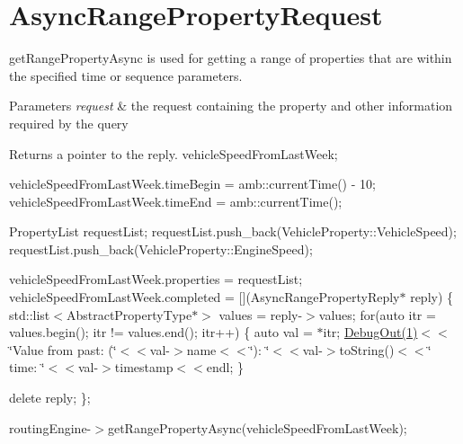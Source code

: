 \hypertarget{AsyncRangePropertyRequest-example}{\section{Async\+Range\+Property\+Request}
}
get\+Range\+Property\+Async is used for getting a range of properties that are within the specified time or sequence parameters. 
\begin{DoxyParams}{Parameters}
{\em request} & the request containing the property and other information required by the query \\
\hline
\end{DoxyParams}
\begin{DoxyReturn}{Returns}
a pointer to the reply. vehicle\+Speed\+From\+Last\+Week;
\end{DoxyReturn}
vehicle\+Speed\+From\+Last\+Week.\+time\+Begin = amb\+::current\+Time() -\/ 10; vehicle\+Speed\+From\+Last\+Week.\+time\+End = amb\+::current\+Time();

Property\+List request\+List; request\+List.\+push\+\_\+back(\+Vehicle\+Property\+::\+Vehicle\+Speed); request\+List.\+push\+\_\+back(\+Vehicle\+Property\+::\+Engine\+Speed);

vehicle\+Speed\+From\+Last\+Week.\+properties = request\+List; vehicle\+Speed\+From\+Last\+Week.\+completed = \mbox{[}\mbox{]}(Async\+Range\+Property\+Reply$\ast$ reply) \{ std\+::list$<$\+Abstract\+Property\+Type$\ast$$>$ values = reply-\/$>$values; for(auto itr = values.\+begin(); itr != values.\+end(); itr++) \{ auto val = $\ast$itr; \hyperlink{classDebugOut}{Debug\+Out(1)}$<$$<$\char`\"{}\+Value from past\+: (\char`\"{}$<$$<$val-\/$>$name$<$$<$\char`\"{})\+: \char`\"{}$<$$<$val-\/$>$to\+String()$<$$<$\char`\"{} time\+: \char`\"{}$<$$<$val-\/$>$timestamp$<$$<$endl; \}

delete reply; \};

routing\+Engine-\/$>$get\+Range\+Property\+Async(vehicle\+Speed\+From\+Last\+Week);


\begin{DoxyCodeInclude}
\end{DoxyCodeInclude}
 